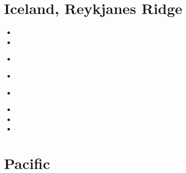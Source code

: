 \section{Iceland, Reykjanes Ridge}

\begin{small}
\begin{itemize}
\item[\nineteeneightynine]
\item[\nineteenninetysix]
\item[\nineteenninetynine]
\\ 
\item[\twothousand]
\item[\twothousandseventeen]
 \\
\item[\twothousandnineteen]
\item[\twothousandtwenty]
\item[\twothousandtwentytwo]
\end{itemize}
\end{small} 

\section{Pacific}

